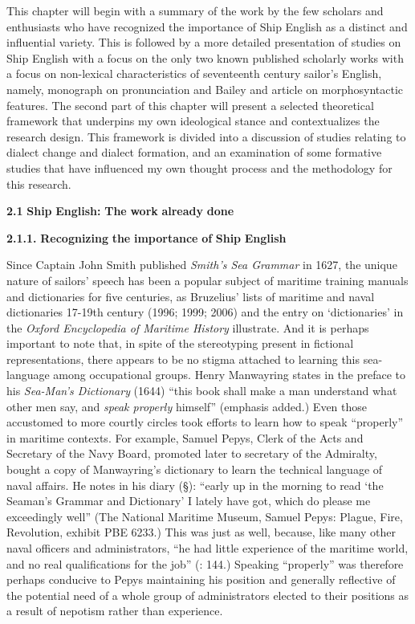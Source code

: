   This chapter will begin with a summary of the work by the few scholars and enthusiasts who have recognized the importance of Ship English as a distinct and influential variety. This is followed by a more detailed presentation of studies on Ship English with a focus on the only two known published scholarly works with a focus on non-lexical characteristics of seventeenth century sailor’s English, namely,  monograph on pronunciation and Bailey and  article on morphosyntactic features. The second part of this chapter will present a selected theoretical framework that underpins my own ideological stance and contextualizes the research design. This framework is divided into a discussion of studies relating to dialect change and dialect formation, and an examination of some formative studies that have influenced my own thought process and the methodology for this research. 

\textbf{2.1} \textbf{Ship} \textbf{English:} \textbf{The} \textbf{work} \textbf{already} \textbf{done}

  \textbf{2.1.1.} \textbf{Recognizing} \textbf{the} \textbf{importance} \textbf{of} \textbf{Ship} \textbf{English}

Since Captain John Smith published \textit{Smith’s Sea Grammar} in 1627, the unique nature of sailors’ speech has been a popular subject of maritime training manuals and dictionaries for five centuries, as Bruzelius’ lists of maritime and naval dictionaries 17-19th century (1996; 1999; 2006) and the entry on ‘dictionaries’ in the \textit{Oxford Encyclopedia of Maritime History} \citep{Hattendorf2007} illustrate. And it is perhaps important to note that, in spite of the stereotyping present in fictional representations, there appears to be no stigma attached to learning this sea-language among occupational groups. Henry Manwayring states in the preface to his \textit{Sea-Man’s Dictionary} (1644) “this book shall make a man understand what other men say, and \textit{speak properly} himself” (emphasis added.) Even those accustomed to more courtly circles took efforts to learn how to speak “properly” in maritime contexts. For example, Samuel Pepys, Clerk of the Acts and Secretary of the Navy Board, promoted later to secretary of the Admiralty, bought a copy of Manwayring’s dictionary to learn the technical language of naval affairs. He notes in his diary (§\citealt{March1661}): “early up in the morning to read ‘the Seaman’s Grammar and Dictionary’ I lately have got, which do please me exceedingly well” (The National Maritime Museum, Samuel Pepys: Plague, Fire, Revolution, exhibit PBE 6233.)  This was just as well, because, like many other naval officers and administrators, “he had little experience of the maritime world, and no real qualifications for the job” (\citealt{Lincoln2015}: 144.) Speaking “properly” was therefore perhaps conducive to Pepys maintaining his position and generally reflective of the potential need of a whole group of administrators elected to their positions as a result of nepotism rather than experience. 

